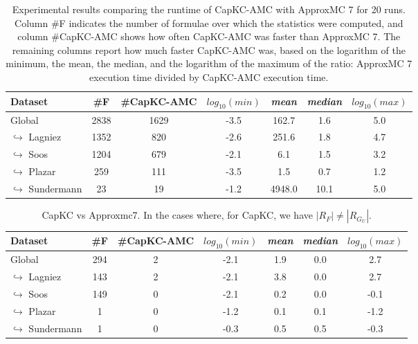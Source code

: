 \documentclass{article}
\newcommand\approxmc[0]{ApproxMC\xspace}
\newcommand\capkc[0]{CapKC\xspace}
\newcommand\capkcamc[0]{CapKC-AMC\xspace}
\begin{document}
    
\begin{table}[h!]
        \centering
            \begin{tabular}{l|c|c|c|c|c|c}
                Dataset & \#F & \#\capkcamc & $\textit{log}_{10}(\textit{min})$ & \textit{mean} & \textit{median} & $\textit{log}_{10}(\textit{max})$ \\
                \hline 
Global & 2838 & 1629 &  -3.5 & 162.7 &   1.6 &   5.0 \\
$\hookrightarrow$ Lagniez \cite{D4} & 1352 & 820 &  -2.6 & 251.6 &   1.8 &   4.7 \\
$\hookrightarrow$ Soos \cite{soos_2024_10449477} & 1204 & 679 &  -2.1 &   6.1 &   1.5 &   3.2 \\
$\hookrightarrow$ Plazar \cite{Plazar2019} & 259 & 111 &  -3.5 &   1.5 &   0.7 &   1.2 \\
$\hookrightarrow$ Sundermann \cite{SBK+:SPLC24} & 23 & 19 &  -1.2 & 4948.0 &  10.1 &   5.0 \\
            \end{tabular}
                \caption{Experimental results comparing the runtime of \capkcamc with \approxmc7 for 20 runs.
            Column \#F indicates the number of formulae over which the statistics were computed, and column \#\capkcamc shows how often \capkcamc was faster than \approxmc7.
            The remaining columns report how much faster \capkcamc was, based on the logarithm of the minimum, the mean, the median, and the logarithm of the maximum of the ratio: \approxmc7 execution time divided by \capkcamc execution time.
        }
        \label{capkc:tab:appmc:run}
    \end{table}

    
\begin{table}[h!]
        \centering
            \begin{tabular}{l|c|c|c|c|c|c}
                Dataset & \#F & \#\capkcamc & $\textit{log}_{10}(\textit{min})$ & \textit{mean} & \textit{median} & $\textit{log}_{10}(\textit{max})$ \\
                \hline 
Global & 294 & 2 &  -2.1 &   1.9 &   0.0 &   2.7 \\
$\hookrightarrow$ Lagniez \cite{D4} & 143 & 2 &  -2.1 &   3.8 &   0.0 &   2.7 \\
$\hookrightarrow$ Soos \cite{soos_2024_10449477} & 149 & 0 &  -2.1 &   0.2 &   0.0 &  -0.1 \\
$\hookrightarrow$ Plazar \cite{Plazar2019} & 1 & 0 &  -1.2 &   0.1 &   0.1 &  -1.2 \\
$\hookrightarrow$ Sundermann \cite{SBK+:SPLC24} & 1 & 0 &  -0.3 &   0.5 &   0.5 &  -0.3 \\
            \end{tabular}
                \caption{\capkc vs Approxmc7. In the cases where, for \capkc, we have $|R_F| \neq |R_{G_U}|$.
        }
    \end{table}

    

    
\end{document}
